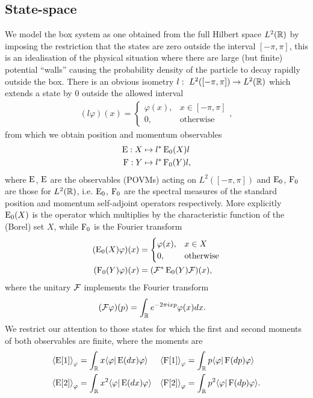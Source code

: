 \subsection{State-space }
We model the box system as one obtained from the full Hilbert space $L^2(\mathbb{R})$ by imposing the restriction that the states are zero outside the interval $[-\pi, \pi]$, this is an idealisation of the physical situation where there are large (but finite) potential ``walls'' causing the probability density of the particle to decay rapidly outside the box. There is an obvious isometry $l:~L^2([-\pi,\pi])\to L^2(\mathbb{R})$ which extends a state by $0$ outside the allowed interval
\begin{align}
  (l\varphi)(x) = \begin{cases}\varphi(x), &x\in [-\pi,\pi]\\ 0, &\text{otherwise}\end{cases},
\end{align}
from which we obtain position and momentum observables 
\begin{align}
  \operatorname{E}:X &\mapsto l^* \operatorname{E}_0(X) l\\
  \operatorname{F}:Y &\mapsto l^* \operatorname{F}_0(Y) l,
\end{align}
where $\operatorname{E}$, $\operatorname{E}$ are the observables (POVMs) acting on $L^2([-\pi,\pi])$ and $\operatorname{E}_0$, $\operatorname{F}_0$ are those for $L^2(\mathbb{R})$, i.e. $\operatorname{E}_0$, $\operatorname{F}_0$ are the spectral measures of the standard position and momentum self-adjoint operators respectively. More explicitly $\operatorname{E}_0(X)$ is the operator which multiplies by the characteristic function of the (Borel) set $X$, while $\operatorname{F}_0$ is the Fourier transform
\begin{align}
  (\operatorname{E}_0(X)\varphi)(x) &= \begin{cases}\varphi(x), &x\in X\\ 0, &\text{otherwise}\end{cases}\\
  (\operatorname{F}_0(Y)\varphi)(x) &= (\mathcal{F}^*\operatorname{E}_0(Y)\mathcal{F})(x),
\end{align}
where the unitary $\mathcal{F}$ implements the Fourier transform
\begin{align}
  (\mathcal{F}\varphi)(p) &= \int_{\mathbb{R}} e^{-2\pi i x p} \varphi(x)dx.
\end{align}
We restrict our attention to those states for which the first and second moments of both observables are finite, where the moments are
\begin{align}
  \left\langle{\operatorname{E}[1]}\right\rangle_{\varphi} &= \int_{\mathbb{R}} x \langle \varphi|\operatorname{E}(dx)\varphi\rangle & \left\langle{\operatorname{F}[1]}\right\rangle_{\varphi} &= \int_{\mathbb{R}} p \langle \varphi|\operatorname{F}(dp)\varphi\rangle\\
  \left\langle{\operatorname{E}[2]}\right\rangle_{\varphi} &= \int_{\mathbb{R}} x^2 \langle \varphi|\operatorname{E}(dx)\varphi\rangle & \left\langle{\operatorname{F}[2]}\right\rangle_{\varphi} &= \int_{\mathbb{R}} p^2 \langle \varphi|\operatorname{F}(dp)\varphi\rangle. 
\end{align}
